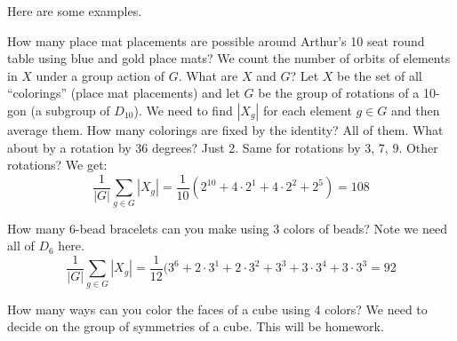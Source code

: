 \documentclass[12pt]{article}
\theoremstyle{plain}
\theoremstyle{definition}
\theoremstyle{remark}
\newcommand{\ex}{\noindent{\bf Ex: }}
\begin{document}
Here are some examples.

\ex How many place mat placements are possible around Arthur's 10 seat round table using blue and gold place mats?  We count the number of orbits of elements in $X$ under a group action of $G$.  What are $X$ and $G$?  Let $X$ be the set of all ``colorings'' (place mat placements) and let $G$ be the group of rotations of a 10-gon (a subgroup of $D_{10}$).  We need to find $|X_g|$ for each element $g \in G$ and then average them.  How many colorings are fixed by the identity?  All of them.  What about by a rotation by 36 degrees?  Just 2.  Same for rotations by 3, 7, 9. Other rotations?  We get:
\[  \frac{1}{|G|}\sum_{g \in G}|X_g| = \frac{1}{10}(2^{10} + 4\cdot 2^1 + 4\cdot 2^2 + 2^5) = 108\]

\ex How many 6-bead bracelets can you make using 3 colors of beads? Note we need all of $D_6$ here.
\[\frac{1}{|G|}\sum_{g \in G}|X_g| = \frac{1}{12}(3^6+2\cdot 3^1 + 2\cdot 3^2 + 3^3 + 3\cdot 3^4 + 3\cdot 3^3 = 92\]

\ex How many ways can you color the faces of a cube using 4 colors?  We need to decide on the group of symmetries of a cube.  This will be homework.
\end{document}
